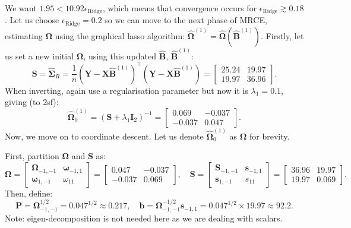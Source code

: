 \documentclass[11pt]{report} %
\begin{document}
We want $1.95 < 10.92\epsilon_{\text{Ridge}}$, which means that convergence occurs for $\epsilon_{\text{Ridge}} \gtrsim 0.18$. Let us choose $\epsilon_{\text{Ridge}} = 0.2$ so we can move to the next phase of MRCE, estimating $\mathbf{\Omega}$ using the graphical lasso algorithm: $\mathbf{\hat{\Omega}}^{(1)} = \mathbf{\hat{\Omega}}(\mathbf{\hat{B}}^{(1)})$. Firstly, let us set a new initial $\mathbf{\Omega}$, using this updated $\mathbf{\hat{B}}$, $\mathbf{\hat{B}}^{(1)}$:
\[
\mathbf{S} = \mathbf{\hat{\Sigma}}_R = \frac{1}{n} (\mathbf{Y} - \mathbf{X} \mathbf{\hat{B}}^{(1)})^\top (\mathbf{Y} - \mathbf{X} \mathbf{\hat{B}}^{(1)})=\begin{bmatrix}
         25.24 & 19.97 \\
         19.97 & 36.96
     \end{bmatrix}.
\]
When inverting, again use a regularisation parameter but now it is $\lambda_1=0.1$, giving (to 2sf):
\[
\mathbf{\hat{\Omega}}^{(1)}_0=(\mathbf{S}+\lambda_1 \mathbf{I}_2)^{-1}=
    \begin{bmatrix}
         0.069 & -0.037 \\
         -0.037 & 0.047
    \end{bmatrix}.
\]
Now, we move on to coordinate descent. Let us denote $\mathbf{\hat{\Omega}}^{(1)}_0$ as $\mathbf{\Omega}$ for brevity.

First, partition \( \mathbf{\Omega} \) and \( \mathbf{S} \) as:
  \[
  \mathbf{\Omega} = \begin{bmatrix}
    \mathbf{\Omega}_{-1,-1} & \boldsymbol{\omega}_{-1,1} \\
    \boldsymbol{\omega}_{1,-1} & \omega_{11}
  \end{bmatrix}=\begin{bmatrix}
    0.047 & -0.037 \\
    -0.037 & 0.069
  \end{bmatrix},
  \quad
  \mathbf{S} = \begin{bmatrix}
    \mathbf{S}_{-1,-1} & \mathbf{s}_{-1,1} \\
    \mathbf{s}_{1,-1} & s_{11}
  \end{bmatrix}=\begin{bmatrix}
    36.96 & 19.97 \\
    19.97 & 0.069
  \end{bmatrix}.
  \]
Then, define:
\vspace{-0.4cm}
  \[
  \mathbf{P} = \mathbf{\Omega}^{1/2}_{-1,-1}=0.047^{1/2}\approx 0.217, \quad \mathbf{b} = \mathbf{\Omega}_{-1,-1}^{-1/2}\mathbf{s}_{-1,1}=0.047^{1/2}\times19.97\approx92.2.
  \]
Note: eigen-decomposition is not needed here as we are dealing with scalars.
  
\end{document}
